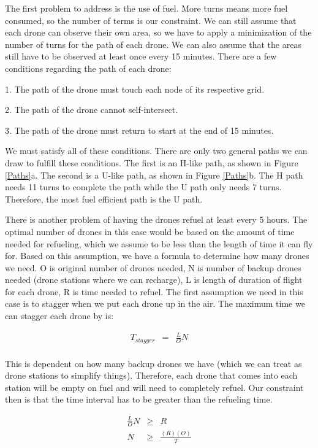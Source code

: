 \documentclass{article}
\begin{document}
The first problem to address is the use of fuel. More turns means more fuel consumed, so the number of terms is our constraint. We can still assume that each drone can observe their own area, so we have to apply a minimization of the number of turns for the path of each drone. We can also assume that the areas still have to be observed at least once every 15 minutes. There are a few conditions regarding the path of each drone:

1. The path of the drone must touch each node of its respective grid. 

2. The path of the drone cannot self-intersect.

3. The path of the drone must return to start at the end of 15 minutes. 

We must satisfy all of these conditions. There are only two general paths we can draw to fulfill these conditions. The first is an H-like path, as shown in Figure \ref{Paths}a. The second is a U-like path, as shown in Figure \ref{Paths}b. The H path needs 11 turns to complete the path while the U path only needs 7 turns. Therefore, the most fuel efficient path is the U path. 

There is another problem of having the drones refuel at least every 5 hours. The optimal number of drones in this case would be based on the amount of time needed for refueling, which we assume to be less than the length of time it can fly for. Based on this assumption, we have a formula to determine how many drones we need. O is original number of drones needed, N is number of backup drones needed (drone stations where we can recharge), L is length of duration of flight for each drone, R is time needed to refuel. The first assumption we need in this case is to stagger when we put each drone up in the air. The maximum time we can stagger each drone by is:

\begin{eqnarray*}
T_{stagger} &=& \frac{L}{O}N	\\
\end{eqnarray*}

This is dependent on how many backup drones we have  (which we can treat as drone stations to simplify things). Therefore, each drone that comes into each station will be empty on fuel and will need to completely refuel. Our constraint then is that the time interval has to be greater than the refueling time. 

\begin{eqnarray*}
\frac{L}{O}N &\geq & R	\\
N &\geq & \frac{(R)(O)}{T}	\\
\end{eqnarray*}
\end{document}
